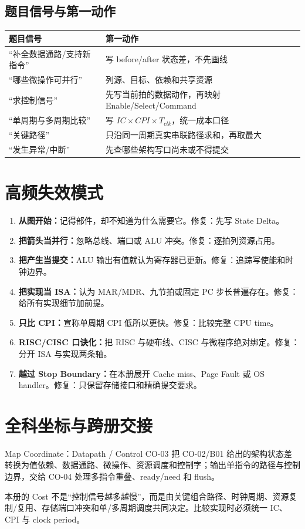 \documentclass[UTF8,fontset=fandol,11pt,a4paper]{ctexart}
\newcommand{\kw}[1]{\textbf{\color{deep}#1}}
\begin{document}
\subsection{题目信号与第一动作}

\begin{center}
\small
\begin{tabularx}{\linewidth}{L{4.1cm}Y}
\toprule
题目信号 & 第一动作 \\
\midrule
“补全数据通路/支持新指令” & 写 before/after 状态差，不先画线 \\
“哪些微操作可并行” & 列源、目标、依赖和共享资源 \\
“求控制信号” & 先写当前拍的数据动作，再映射 Enable/Select/Command \\
“单周期与多周期比较” & 写 $IC\times CPI\times T_{clk}$，统一成本口径 \\
“关键路径” & 只沿同一周期真实串联路径求和，再取最大 \\
“发生异常/中断” & 先查哪些架构写口尚未或不得提交 \\
\bottomrule
\end{tabularx}
\end{center}

\section{高频失效模式}

\begin{enumerate}
  \item \kw{从图开始：}记得部件，却不知道为什么需要它。修复：先写 State Delta。
  \item \kw{把箭头当并行：}忽略总线、端口或 ALU 冲突。修复：逐拍列资源占用。
  \item \kw{把产生当提交：}ALU 输出有值就认为寄存器已更新。修复：追踪写使能和时钟边界。
  \item \kw{把实现当 ISA：}认为 MAR/MDR、九节拍或固定 PC 步长普遍存在。修复：给所有实现细节加前提。
  \item \kw{只比 CPI：}宣称单周期 CPI 低所以更快。修复：比较完整 CPU time。
  \item \kw{RISC/CISC 口诀化：}把 RISC 与硬布线、CISC 与微程序绝对绑定。修复：分开 ISA 与实现两条轴。
  \item \kw{越过 Stop Boundary：}在本册展开 Cache miss、Page Fault 或 OS handler。修复：只保留存储接口和精确提交要求。
\end{enumerate}

\section{全科坐标与跨册交接}
\begin{corebox}{Map Coordinate：Datapath / Control}
CO-03 把 CO-02/B01 给出的架构状态差转换为值依赖、数据通路、微操作、资源调度和控制字；输出单指令的路径与控制边界，交给 CO-04 处理多指令重叠、ready/need 和 flush。
\end{corebox}
本册的 Cost 不是“控制信号越多越慢”，而是由关键组合路径、时钟周期、资源复制/复用、存储端口冲突和单/多周期调度共同决定。比较实现时必须统一 IC、CPI 与 clock period。
\end{document}
